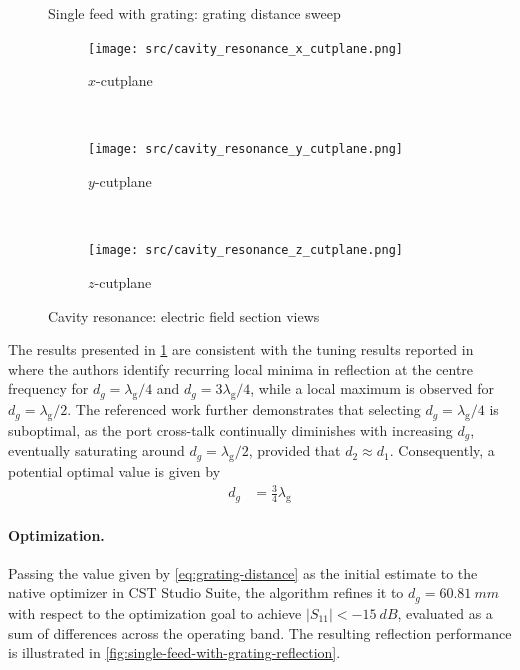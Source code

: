 \documentclass[11pt,a4paper,twoside,openany]{report}
\begin{document}
\begin{figure}[bh]
    \centering
    
    \caption{\label{fig:grating-distance-sweep}Single feed with grating: grating distance sweep}
\end{figure}

\begin{figure}[th]
    \centering
    \begin{subfigure}{.3\textwidth}
        \centering
        \texttt{[image: src/cavity\_resonance\_x\_cutplane.png]}
        \caption{\label{fig:cavity-resonance-x-cutplane}$x$-cutplane}
    \end{subfigure}
    ~
    \begin{subfigure}{.3\textwidth}
        \centering
        \texttt{[image: src/cavity\_resonance\_y\_cutplane.png]}
        \caption{\label{fig:cavity-resonance-y-cutplane}$y$-cutplane}
    \end{subfigure}
    ~
    \begin{subfigure}{.3\textwidth}
        \centering
        \texttt{[image: src/cavity\_resonance\_z\_cutplane.png]}
        \caption{\label{fig:cavity-resonance-z-cutplane}$z$-cutplane}
    \end{subfigure}
    \caption{\label{fig:cavity-resonant}Cavity resonance: electric field section views}
\end{figure}

The results presented in \cref{fig:grating-distance-sweep} are consistent with the tuning results reported in~\parencite{karki-et-al:dual-polarized-probe-for-planar-near-field-measurement} where the authors identify recurring local minima in reflection at the centre frequency for $d_g = \lambda_{\mathrm g}/4$ and $d_g = 3\lambda_{\mathrm g}/4$, while a local maximum is observed for $d_g = \lambda_{\mathrm g}/2$. The referenced work further demonstrates that selecting $d_g = \lambda_{\mathrm g}/4$ is suboptimal, as the port cross-talk continually diminishes with increasing $d_g$, eventually saturating around $d_g = \lambda_{\mathrm g}/2$, provided that $d_2\approx d_1$. Consequently, a potential optimal value is given by
\begin{align}
    \label{eq:grating-distance}
    d_g &= \frac{3}{4}\lambda_{\mathrm g}
\end{align}

\paragraph{Optimization.} Passing the value given by \cref{eq:grating-distance} as the initial estimate to the native optimizer in CST Studio Suite, the algorithm refines it to $d_g = \qty{60.81}{mm}$ with respect to the optimization goal to achieve $|S_{11}| < -\qty{15}{dB}$, evaluated as a sum of differences across the operating band. The resulting reflection performance is illustrated in \cref{fig:single-feed-with-grating-reflection}.
\end{document}
